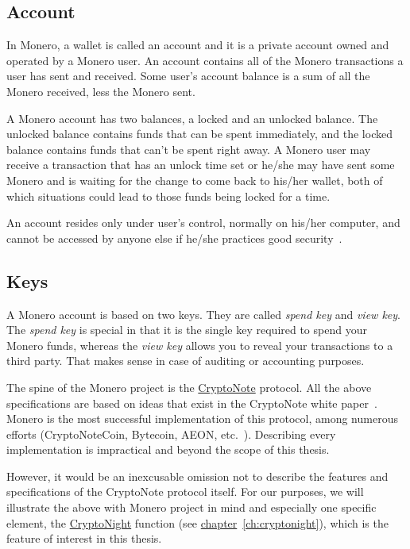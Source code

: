 \subsection{Account}
In Monero, a wallet is called an account and it is a private account owned and operated by a Monero user. An account contains all of the Monero transactions a user has sent and received. Some user's account balance is a sum of all the Monero received, less the Monero sent.

A Monero account has two balances, a locked and an unlocked balance. The unlocked balance contains funds that can be spent immediately, and the locked balance contains funds that can't be spent right away. A Monero user may receive a transaction that has an unlock time set or he/she may have sent some Monero and is waiting for the change to come back to his/her wallet, both of which situations could lead to those funds being locked for a time.

An account resides only under user's control, normally on his/her computer, and cannot be accessed by anyone else if he/she practices good security~\cite{getmonero}.

\subsection{Keys}
A Monero account is based on two keys. They are called \emph{spend key} and \emph{view key}. The \emph{spend key} is special in that it is the single key required to spend your Monero funds, whereas the \emph{view key} allows you to reveal your transactions to a third party. That makes sense in case of auditing or accounting purposes.
\vspace{0.8cm}

The spine of the Monero project is the \hyperref[sec:CryptoNote]{CryptoNote} protocol. All the above specifications are based on ideas that exist in the CryptoNote white paper~\cite{citeulike:14139412}. Monero is the most successful implementation of this protocol, among numerous efforts (CryptoNoteCoin, Bytecoin, AEON, etc.~\cite{cryptonotecoins}). Describing every implementation is impractical and beyond the scope of this thesis.

However, it would be an inexcusable omission not to describe the features and specifications of the CryptoNote protocol itself. For our purposes, we will illustrate the above with Monero project in mind and especially one specific element, the \hyperref[ch:cryptonight]{CryptoNight} function (see \hyperref[ch:cryptonight]{chapter}~\ref{ch:cryptonight}), which is the feature of interest in this thesis.

